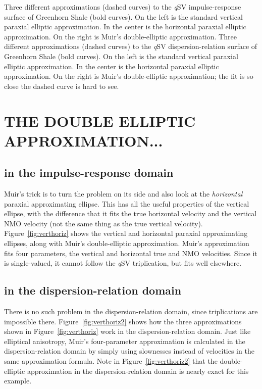 {
Three different approximations (dashed curves) to the
{\sl q}SV impulse-response surface of Greenhorn Shale (bold curves).
On the left is the standard vertical paraxial elliptic approximation. In the
center is the horizontal paraxial elliptic approximation.
On the right is Muir's double-elliptic approximation.
}
{
Three different approximations (dashed curves) to the
{\sl q}SV dispersion-relation surface of Greenhorn Shale (bold curves).
On the left is the standard vertical paraxial elliptic approximation. In the
center is the horizontal paraxial elliptic approximation.
On the right is Muir's double-elliptic approximation;
the fit is so close the dashed curve is hard to see.
}

\section{THE DOUBLE ELLIPTIC APPROXIMATION...}
\subsection{in the impulse-response domain}
Muir's trick is to turn the problem on its side and also look at the
{\em horizontal\/} paraxial approximating ellipse. This has all the
useful properties of the vertical ellipse, with the difference
that it fits the true horizontal velocity and the vertical NMO velocity
(not the same thing as the true vertical velocity).
Figure~\ref{fig:verthoriz} shows the vertical and horizontal
paraxial approximating ellipses, along with
Muir's double-elliptic approximation. Muir's approximation fits
four parameters, the vertical and horizontal true and NMO velocities.
Since it is single-valued, it cannot follow the {\sl q}SV triplication,
but fits well elsewhere.

\subsection{in the dispersion-relation domain}
There is no such problem in the dispersion-relation domain, since
triplications are impossible there.
Figure~\ref{fig:verthoriz2} shows how the three approximations shown
in Figure~\ref{fig:verthoriz} work in the dispersion-relation domain.
Just like elliptical anisotropy,
Muir's four-parameter approximation is calculated
in the dispersion-relation domain
by simply using slownesses instead of velocities
in the same approximation formula.
Note in Figure~\ref{fig:verthoriz2} that the
double-elliptic approximation in the dispersion-relation domain
is nearly exact for this example.

